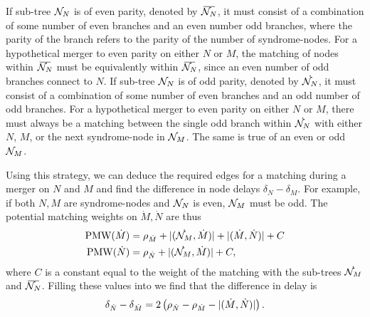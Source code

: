 If sub-tree $\mathcal{N}_N$ is of even parity, denoted by $\overbar{\nset_N}$, it must consist of a combination of some number of even branches and an even number odd branches, where the parity of the branch refers to the parity of the number of syndrome-nodes. For a hypothetical merger to even parity on either $N$ or $M$, the matching of nodes within $\overbar{\nset_N}$ must be equivalently within $\overbar{\nset_N}$, since an even number of odd branches connect to $N$. If sub-tree $\mathcal{N}_N$ is of odd parity, denoted by $\dot{\mathcal{N}_N}$, it must consist of a combination of some number of even branches and an odd number of odd branches. For a hypothetical merger to even parity on either $N$ or $M$, there must always be a matching between the single odd branch within $\dot{\mathcal{N}_N}$ with either $N$, $M$, or the next syndrome-node in $\mathcal{N}_M$. The same is true of an even or odd $\mathcal{N}_M$.

Using this strategy, we can deduce the required edges for a matching during a merger on $N$ and $M$ and find the difference in node delays $\delta_N - \delta_M$. For example, if both $N,M$ are syndrome-nodes and $\mathcal{N}_N$ is even, $\mathcal{N}_M$ must be odd. The potential matching weights on $\dot{M},\dot{N}$ are thus
\begin{align*}
  \text{PMW}(\dot{M}) &= \rho_{\dot{M}} + \lvert(\dot{\mathcal{N}_M},\dot{M})\rvert + \lvert(\dot{M}, \dot{N})\rvert + C \\
  \text{PMW}(\dot{N}) &= \rho_{\dot{N}} + \lvert(\dot{\mathcal{N}_M},\dot{M})\rvert + C,
\end{align*}
where $C$ is a constant equal to the weight of the matching with the sub-trees $\dot{\mathcal{N}_M}$ and $\overbar{\nset_N}$. Filling these values into  we find that the difference in delay is 
\begin{equation*}
  \delta_{\dot{N}} - \delta_{\dot{M}} = 2\left(\rho_{\dot{N}} - \rho_{\dot{M}} - \lvert(\dot{M}, \dot{N})\rvert\right).
\end{equation*}

